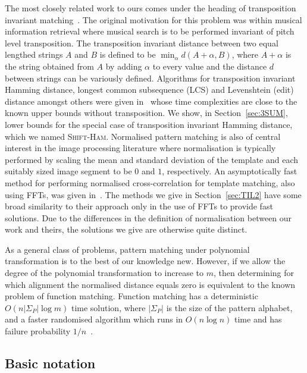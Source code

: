 \documentclass[11pt]{article}
\newcommand{\sHam}{\textsc{Shift-Ham}\xspace}
\newcommand{\margin}[1]{}
\theoremstyle{plain}
\theoremstyle{definition}
\begin{document}
The most closely related work to ours comes under the heading of transposition invariant matching~\cite{LU:2000}.  The original motivation for this problem was within musical information retrieval where musical search is to be performed invariant of pitch level transposition. The transposition invariant distance between two equal lengthed strings $A$ and $B$ is defined to be $\min_{\alpha} d(A+\alpha, B)$, where $A+\alpha$ is the string obtained from $A$ by adding $\alpha$ to every value and the distance $d$ between strings can be variously defined.  Algorithms for transposition invariant Hamming distance, longest common subsequence (LCS) and Levenshtein (edit) distance amongst others were given in~\cite{MNU:2005} whose time complexities are close to the known upper bounds without transposition.   We show, in Section~\ref{sec:3SUM}, lower bounds for the special case of transposition invariant Hamming distance, which we named \sHam. Normalised pattern matching is also of central interest in the image processing literature where normalisation is typically performed by scaling the mean and standard deviation of the template and each suitably sized image segment to be $0$ and $1$, respectively. An asymptotically fast method for performing normalised cross-correlation for template matching, also using FFTs, was given in~\cite{Lewis:1995}.  The methods we give in Section~\ref{sec:TIL2} have some broad similarity to their approach only in the use of FFTs to provide fast solutions. Due to the differences in the definition of normalisation between our work and theirs, the solutions we give are otherwise quite distinct.




As a general class of problems, pattern matching under polynomial transformation is to the best of our knowledge new.  However, if we allow the degree of the polynomial transformation to increase to $m$, then determining for which alignment the normalised distance equals zero is equivalent to the known problem of function matching.  Function matching has a deterministic $O(n|\Sigma_P|\log{m})$ time solution, where $|\Sigma_P|$ is the size of the pattern alphabet, and a faster randomised algorithm which runs in $O(n\log{n})$ time and has failure probability $1/n$~\cite{AALP:2006}.  \margin{Higher degree: Add relationship to our higher degree result when it exists.}




\subsection{Basic notation}
\end{document}
